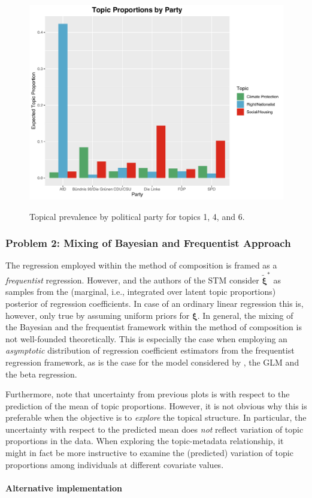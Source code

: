 \begin{figure}[h!]
  \centering
  \captionsetup{justification=centering,margin=2cm}
  \includegraphics[scale = 0.5]{../plots/5_1/quasi_t146_cat.pdf} \\
  \caption{Topical prevalence by political party for topics 1, 4, and 6.}
  \label{fig:quasi_t146_cat}
\end{figure}

\subsubsection{Problem 2: Mixing of Bayesian and Frequentist Approach}

The regression employed within the method of composition is framed as a \textit{frequentist} regression. However, \cite{treier2008democracy} and the authors of the STM consider $\tilde{\boldsymbol{\xi}}^*$ as samples from the (marginal, i.e., integrated over latent topic proportions) posterior of regression coefficients. In case of an ordinary linear regression this is, however, only true by assuming uniform priors for $\boldsymbol{\xi}$. In general, the mixing of the Bayesian and the frequentist framework within the method of composition is not well-founded theoretically. This is especially the case when employing an \textit{asymptotic} distribution of regression coefficient estimators from the frequentist regression framework, as is the case for the model considered by \cite{treier2008democracy}, the GLM and the beta regression.

Furthermore, note that uncertainty from previous plots is with respect to the prediction of the mean of topic proportions. However, it is not obvious why this is preferable when the objective is to \textit{explore} the topical structure. In particular, the uncertainty with respect to the predicted mean does \textit{not} reflect variation of topic proportions in the data. When exploring the topic-metadata relationship, it might in fact be more instructive to examine the (predicted) variation of topic proportions among individuals at different covariate values.\\
\\
\noindent \textbf{Alternative implementation} \vspace{10px}

